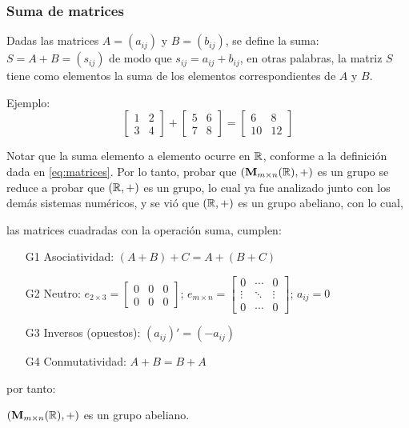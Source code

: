 \subsubsection{Suma de matrices}

Dadas las matrices $A = (a_{ij})$ y $B = (b_{ij})$, se define la suma: $S = A + B = (s_{ij})$ de modo que $s_{ij} = a_{ij} + b_{ij}$, en otras palabras, la matriz $S$ tiene como elementos la suma de los elementos correspondientes de $A$ y $B$.

Ejemplo:
\[ \begin{bmatrix}
	1 & 2\\
	3 & 4
\end{bmatrix} + \begin{bmatrix}
	5 & 6\\
	7 & 8
\end{bmatrix} = \begin{bmatrix}
	6 & 8\\
	10 & 12
\end{bmatrix} \]

Notar que la suma elemento a elemento ocurre en $\mathbb{R}$, conforme a la definición dada en \eqref{eq:matrices}. Por lo tanto, probar que $(\mathbf{M}_{m\times n}(\mathbb{R}), +)$ es un grupo se reduce a probar que $(\mathbb{R}, +)$ es un grupo, lo cual ya fue analizado junto con los demás sistemas numéricos, y se vió que $(\mathbb{R}, +)$ es un grupo abeliano, con lo cual,

las matrices cuadradas con la operación suma, cumplen:
\begin{itemize}
	\item[G1] Asociatividad: $(A + B) + C = A + (B + C)$ \quad \cmark 
	\item[G2] Neutro: $e_{2\times 3} = \begin{bmatrix} 0 & 0 & 0\\0 & 0 & 0 \end{bmatrix}$;
	$e_{m \times n} = \begin{bmatrix} 0 & \cdots & 0\\ \vdots & \ddots & \vdots\\ 0 & \cdots & 0 \end{bmatrix}$; $a_{ij} = 0$ \quad \cmark 
	\item[G3] Inversos (opuestos):  $(a_{ij})' = (-a_{ij})$ \quad \cmark 
	\item[G4] Conmutatividad: $A + B = B + A$ \quad \cmark 
\end{itemize}
por tanto:

\begin{center}
	$\left( \mathbf{M}_{m \times n}(\mathbb{R}), + \right)$ es un grupo abeliano.
\end{center}

